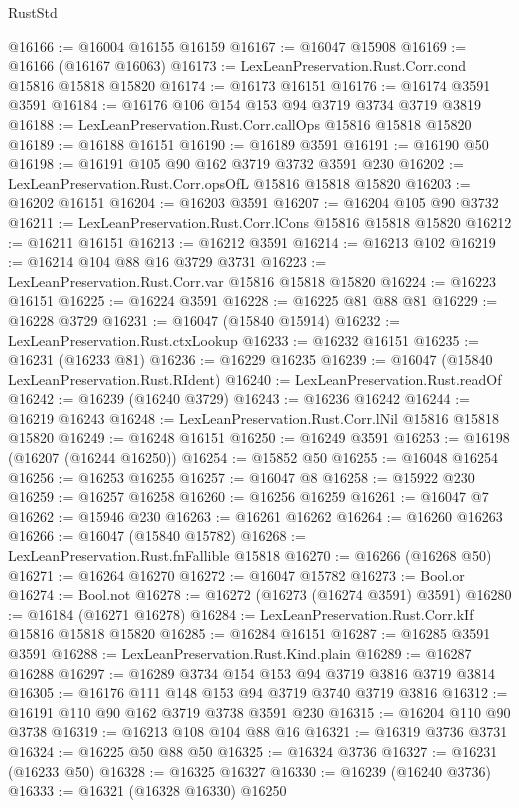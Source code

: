 \begin{lexlean}{RustStd}
\begin{coremodule}
@16166 := @16004 @16155 @16159
@16167 := @16047 @15908
@16169 := @16166 (@16167 @16063)
@16173 := LexLeanPreservation.Rust.Corr.cond @15816 @15818 @15820
@16174 := @16173 @16151
@16176 := @16174 @3591 @3591
@16184 := @16176 @106 @154 @153 @94 @3719 @3734 @3719 @3819
@16188 := LexLeanPreservation.Rust.Corr.callOps @15816 @15818 @15820
@16189 := @16188 @16151
@16190 := @16189 @3591
@16191 := @16190 @50
@16198 := @16191 @105 @90 @162 @3719 @3732 @3591 @230
@16202 := LexLeanPreservation.Rust.Corr.opsOfL @15816 @15818 @15820
@16203 := @16202 @16151
@16204 := @16203 @3591
@16207 := @16204 @105 @90 @3732
@16211 := LexLeanPreservation.Rust.Corr.lCons @15816 @15818 @15820
@16212 := @16211 @16151
@16213 := @16212 @3591
@16214 := @16213 @102
@16219 := @16214 @104 @88 @16 @3729 @3731
@16223 := LexLeanPreservation.Rust.Corr.var @15816 @15818 @15820
@16224 := @16223 @16151
@16225 := @16224 @3591
@16228 := @16225 @81 @88 @81
@16229 := @16228 @3729
@16231 := @16047 (@15840 @15914)
@16232 := LexLeanPreservation.Rust.ctxLookup
@16233 := @16232 @16151
@16235 := @16231 (@16233 @81)
@16236 := @16229 @16235
@16239 := @16047 (@15840 LexLeanPreservation.Rust.RIdent)
@16240 := LexLeanPreservation.Rust.readOf
@16242 := @16239 (@16240 @3729)
@16243 := @16236 @16242
@16244 := @16219 @16243
@16248 := LexLeanPreservation.Rust.Corr.lNil @15816 @15818 @15820
@16249 := @16248 @16151
@16250 := @16249 @3591
@16253 := @16198 (@16207 (@16244 @16250))
@16254 := @15852 @50
@16255 := @16048 @16254
@16256 := @16253 @16255
@16257 := @16047 @8
@16258 := @15922 @230
@16259 := @16257 @16258
@16260 := @16256 @16259
@16261 := @16047 @7
@16262 := @15946 @230
@16263 := @16261 @16262
@16264 := @16260 @16263
@16266 := @16047 (@15840 @15782)
@16268 := LexLeanPreservation.Rust.fnFallible @15818
@16270 := @16266 (@16268 @50)
@16271 := @16264 @16270
@16272 := @16047 @15782
@16273 := Bool.or
@16274 := Bool.not
@16278 := @16272 (@16273 (@16274 @3591) @3591)
@16280 := @16184 (@16271 @16278)
@16284 := LexLeanPreservation.Rust.Corr.kIf @15816 @15818 @15820
@16285 := @16284 @16151
@16287 := @16285 @3591 @3591
@16288 := LexLeanPreservation.Rust.Kind.plain
@16289 := @16287 @16288
@16297 := @16289 @3734 @154 @153 @94 @3719 @3816 @3719 @3814
@16305 := @16176 @111 @148 @153 @94 @3719 @3740 @3719 @3816
@16312 := @16191 @110 @90 @162 @3719 @3738 @3591 @230
@16315 := @16204 @110 @90 @3738
@16319 := @16213 @108 @104 @88 @16
@16321 := @16319 @3736 @3731
@16324 := @16225 @50 @88 @50
@16325 := @16324 @3736
@16327 := @16231 (@16233 @50)
@16328 := @16325 @16327
@16330 := @16239 (@16240 @3736)
@16333 := @16321 (@16328 @16330) @16250

\end{coremodule}
\end{lexlean}
